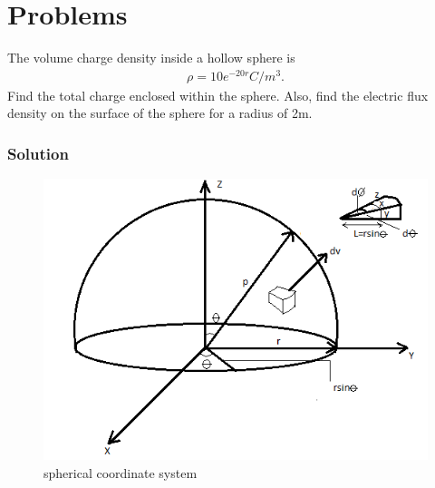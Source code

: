 \section{Problems}
\begin{exmp}
The volume charge density inside a hollow sphere is 
\begin{align*}
\rho=10e^{-20r} C/m^{3}.
\end{align*}
Find the total charge enclosed within the sphere. Also, find the electric flux density on the surface of the sphere for a radius of 2m.

\subsubsection*{Solution}
\begin{figure}[h]
\centering
\includegraphics[width=1\linewidth]{graphics/fig194}
\caption{spherical coordinate system}
\end{figure} 


\end{exmp}
